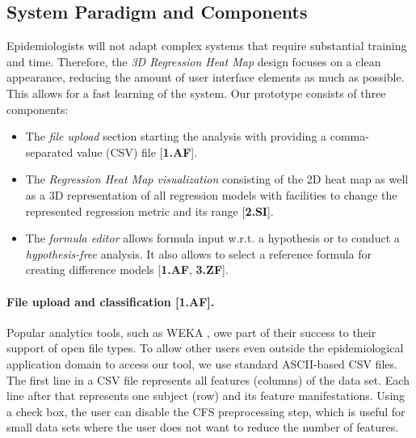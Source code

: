 \documentclass[journal]{style/vgtc} 			          %
\begin{document}
\subsection{System Paradigm and Components}
Epidemiologists will not adapt complex systems that require substantial training and time. %
Therefore, the \emph{3D Regression Heat Map} design focuses on a clean appearance, reducing the amount of user interface elements as much as possible.
This allows for a fast learning of the system.
Our prototype consists of three components:
\begin{itemize}
	\item The \emph{file upload} section starting the analysis with providing a comma-separated value (CSV) file [\textbf{1.AF}].
	\item The \emph{Regression Heat Map visualization} consisting of the 2D heat map as well as a 3D representation of all regression models with facilities to change the represented regression metric and its range [\textbf{2.SI}].
	\item The \emph{formula editor} allows formula input w.r.t. a hypothesis or to conduct a \emph{hypothesis-free} analysis.
	It also allows to select a reference formula for creating difference models [\textbf{1.AF}, \textbf{3.ZF}].
\end{itemize}
\paragraph{File upload and classification [\textbf{1.AF}].}
Popular analytics tools, such as WEKA \cite{WEKA}, owe part of their success to their support of open file types.
To allow other users even outside the epidemiological application domain to access our tool, we use standard ASCII-based CSV files.
The first line in a CSV file represents all features (columns) of the data set.
Each line after that represents one subject (row) and its feature manifestations.
Using a check box, the user can disable the CFS preprocessing step, which is useful for small data sets where the user does not want to reduce the number of features.
\end{document}
